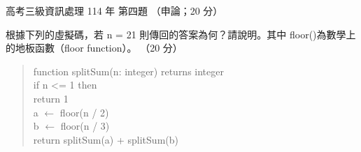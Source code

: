 \begin{pastexam}[label={px:gk3-114-ds-04}]{高考三級資訊處理 114 年 第四題}
（申論；20 分）

根據下列的虛擬碼，若 n = 21 則傳回的答案為何？請說明。其中 floor()為數學上的地板函數（floor function）。
（20 分）

\begin{quote}
function splitSum(n: integer) returns integer\\
\hspace*{1.5em}if n <= 1 then\\
\hspace*{3em}return 1\\
\hspace*{1.5em}a $\leftarrow$ floor(n / 2)\\
\hspace*{1.5em}b $\leftarrow$ floor(n / 3)\\
\hspace*{3em}return splitSum(a) + splitSum(b)
\end{quote}
\end{pastexam}

